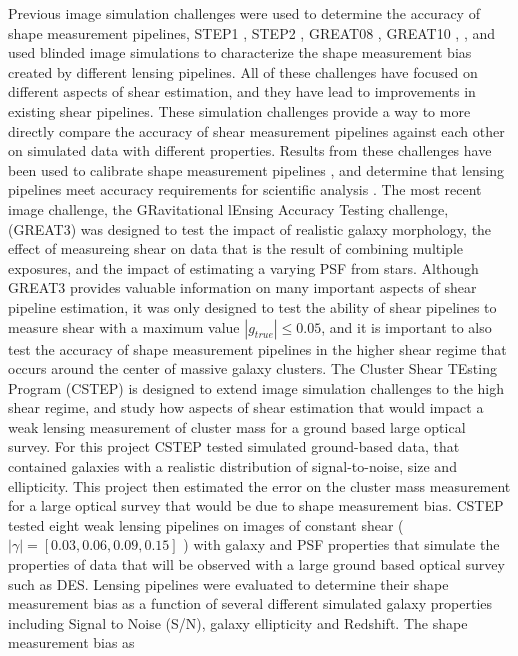 \documentclass[useAMS,usenatbib]{mn2e}
\begin{document}
\indent Previous image simulation challenges were used to determine
the accuracy of shape measurement pipelines, STEP1 \citep{STEP1},
STEP2 \citep{STEP2}, GREAT08 \citep{GREAT08}, GREAT10
\citep{GREAT10}, \citep{great3}, and used blinded image
simulations to characterize the shape measurement bias created by
different lensing pipelines. All of these challenges have focused on
different aspects of shear estimation, and they have lead to
improvements in existing shear pipelines. These simulation challenges provide a way to
more directly compare the accuracy of shear measurement pipelines against each other
on simulated data with different properties. Results from these challenges have been
used to calibrate shape measurement pipelines \citep[e.g.][]{Apple},
and determine that lensing pipelines meet accuracy requirements for scientific
analysis \citep[e.g.][]{Berge}. The most recent image challenge, the
GRavitational lEnsing Accuracy Testing challenge, (GREAT3) was
designed to test the impact of realistic galaxy morphology, the effect
of measureing shear on data that is the result of combining multiple
exposures, and the impact of estimating a varying PSF from
stars. Although GREAT3 provides valuable information on many important
aspects of shear pipeline estimation, it was only designed to test the ability of shear
pipelines to measure shear with a maximum value $|g_{true}| \leq 0.05
$, and it is important to also test the accuracy of shape measurement
pipelines in the higher shear regime that occurs around the center of
massive galaxy clusters.
\indent
The Cluster Shear TEsting Program (CSTEP) is designed to extend image
simulation challenges to the high shear regime, and study how aspects of
shear estimation that would impact a weak lensing measurement of
cluster mass for a ground based large optical survey. For this project CSTEP tested
simulated ground-based data, that contained galaxies with a realistic
distribution of signal-to-noise, size and ellipticity. This project
then estimated the error on the cluster mass measurement for a
large optical survey that would be due to shape measurement bias.
CSTEP tested eight weak lensing pipelines on images of constant shear
($|\gamma| = [0.03, 0.06, 0.09, 0.15]$ ) with galaxy and PSF properties that simulate the properties
of data that will be observed with a large ground based optical survey
such as DES. Lensing pipelines
were evaluated to determine their shape measurement bias as a function
of several different simulated galaxy properties including Signal to
Noise (S/N), galaxy ellipticity and Redshift. The shape measurement bias as 
\end{document}

